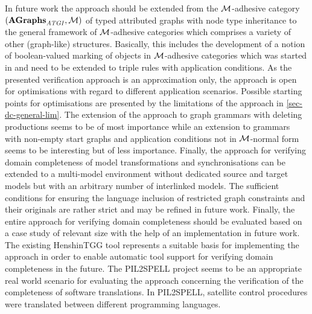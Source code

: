 In future work the approach should be extended from the ${\cal M}$-adhesive category $(\mathbf{AGraphs}_\mathit{ATGI},{\cal M})$ of typed attributed graphs with node type inheritance to the general framework of ${\cal M}$-adhesive categories which comprises a variety of other (graph-like) structures.
Basically, this includes the development of a notion of boolean-valued marking of objects in ${\cal M}$-adhesive categories which was started in \cite{HEOG10a} and need to be extended to triple rules with application conditions.
As the presented verification approach is an approximation only, the approach is open for optimisations with regard to different application scenarios.
Possible starting points for optimisations are presented by the limitations of the approach in \cref{sec-dc-general-lim}.
The extension of the approach to graph grammars with deleting productions seems to be of most importance while an extension to grammars with non-empty start graphs and application conditions not in ${\cal M}$-normal form seems to be interesting but of less importance.
Finally, the approach for verifying domain completeness of model transformations and synchronisations can be extended to a multi-model environment \cite{DBLP:conf/icmt/TrollmannA15} without dedicated source and target models but with an arbitrary number of interlinked models.
%
The sufficient conditions for ensuring the language inclusion of restricted graph constraints and their originals are rather strict and may be refined in future work.
Finally, the entire approach for verifying domain completeness should be evaluated based on a case study of relevant size with the help of an implementation in future work.
The existing HenshinTGG tool \cite{HenshinTGG,DBLP:conf/staf/0001NBEG14} represents a suitable basis for implementing the approach in order to enable automatic tool support for verifying domain completeness in the future.
The PIL2SPELL project \cite{DBLP:conf/icmt/0001GNEBMPEE14} seems to be an appropriate real world scenario for evaluating the approach concerning the verification of the completeness of software translations.
In PIL2SPELL, satellite control procedures were translated between different programming languages.